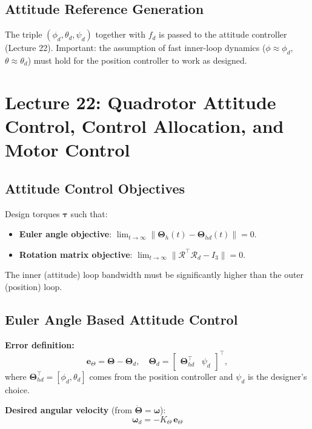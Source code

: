 \documentclass[11pt,a4paper]{article}
\newcommand{\vect}[1]{\bm{#1}}
\begin{document}
\subsection{Attitude Reference Generation}

The triple $(\phi_d, \theta_d, \psi_d)$ together with $f_d$ is passed to the attitude controller (Lecture 22).
Important: the assumption of fast inner-loop dynamics ($\phi\approx\phi_d$, $\theta\approx\theta_d$) must hold for the position controller to work as designed.

\newpage
\section{Lecture 22: Quadrotor Attitude Control, Control Allocation, and Motor Control}

\subsection{Attitude Control Objectives}

Design torques $\vect\tau$ such that:
\begin{itemize}
  \item \textbf{Euler angle objective}: $\displaystyle\lim_{t\to\infty}\|\vect{\Theta}_h(t)-\vect{\Theta}_{hd}(t)\|=0$.
  \item \textbf{Rotation matrix objective}: $\displaystyle\lim_{t\to\infty}\|\mathcal{R}^\top\mathcal{R}_d - I_3\|=0$.
\end{itemize}
The inner (attitude) loop bandwidth must be significantly higher than the outer (position) loop.

\subsection{Euler Angle Based Attitude Control}

\textbf{Error definition:}
\[
\vect{e}_\Theta = \vect{\Theta} - \vect{\Theta}_d,
\quad
\vect{\Theta}_d = \begin{bmatrix}\vect{\Theta}_{hd}^\top & \psi_d\end{bmatrix}^\top,
\]
where $\vect{\Theta}_{hd}^\top = [\phi_d,\theta_d]$ comes from the position controller and $\psi_d$ is the designer's choice.

\textbf{Desired angular velocity} (from $\dot{\vect{\Theta}}=\vect\omega$):
\[
\boxed{\vect\omega_d = -K_\Theta\,\vect{e}_\Theta}
\]
\end{document}
